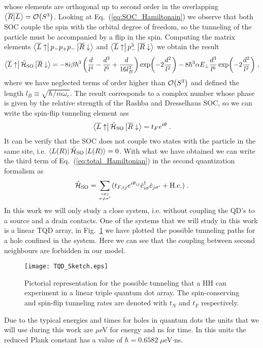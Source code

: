 whose elements are orthogonal up to second order in the overlapping $\braket{\overline{R}}{\overline{L}}=\order{S^3}$. Looking at Eq.~(\ref{eq:SOC_Hamiltonain}) we observe that both SOC couple the spin with the orbital degree of freedom, so the tunneling of the particle must be accompanied by a flip in the spin. Computing the matrix elements $\bra{\overline{L}\uparrow}p_-p_+p_-\ket{\overline{R}\downarrow}$ and $\bra{\overline{L}\uparrow}p_-^3\ket{\overline{R}\downarrow}$ we obtain the result
\begin{equation}
	\bra{\overline{L}\uparrow}\hat{\mathcal{H}}_{\text{SO}}\ket{\overline{R}\downarrow}=-8i\beta\hbar^3\left(\frac{d}{l^4}-\frac{d^3}{l^6}+\frac{d}{16l_B^2}\right)\exp(-2\frac{d^2}{l^2})-8\hbar^3\alpha E_\perp \frac{d^3}{l^6}\exp(-2\frac{d^2}{l^2})\; ,
\end{equation}
where we have neglected terms of order higher than $\order{S^3}$ and defined the length $l_B\equiv \sqrt{\hbar/m\omega_c}$. The result corresponds to a complex number whose phase is given by the relative strength of the Rashba and Dresselhaus SOC, so we can write the spin-flip tunneling element ass
\begin{equation}
	\bra{\overline{L}\uparrow}\hat{\mathcal{H}}_{\text{SO}}\ket{\overline{R}\downarrow}=t_Fe^{i\theta}\; .
\end{equation}
It can be verify that the SOC does not couple two states with the particle in the same site, i.e. $\bra{L (R)}\hat{\mathcal{H}}_{\text{SO}}\ket{L (R)}=0$. With what we have obtained we can write the third term of Eq.~(\ref{eq:total_Hamiltonian}) in the second quantization formalism as
\begin{equation}
	\hat{\mathcal{H}}_{\text{SO}}=\sum_{i\neq j\atop \sigma\neq\sigma'}(t_{F,ij}e^{i\theta_{ij}}\hat{c}^\dagger_{i\sigma}\hat{c}_{j\sigma'}+\text{H.c.} )\; .
\end{equation}
In this work we will only study a close system, i.e. without coupling the QD's to a source and a drain contacts. One of the systems that we will study in this work is a linear TQD array, in Fig.~\ref{fig:TQD_Sketch} we have plotted the possible tunneling paths for a hole confined in the system. Here we can see that the coupling between second neighbours are forbidden in our model.
\begin{figure}[!htbp]
	\centering
	\texttt{[image: TQD\_Sketch.eps]}
	\caption{Pictorial representation for the possible tunneling that a HH can experiment in a linear triple quantum dot array. The spin-conserving and spin-flip tunneling rates are denoted with $t_N$ and $t_F$ respectively.}
	\label{fig:TQD_Sketch}
\end{figure}

Due to the typical energies and times for holes in quantum dots the units that we will use during this work are $\mu$eV for energy and ns for time. In this units the reduced Plank constant has a value of $\hbar=0.6582 \; \mu$eV$\cdot$ns.


